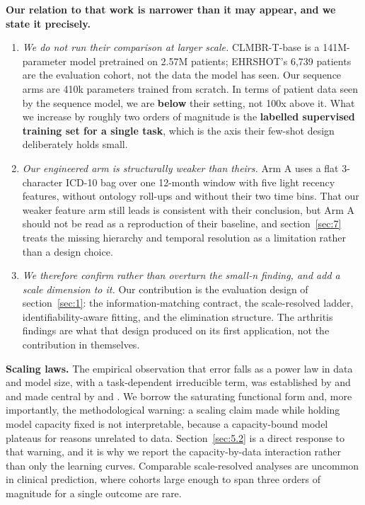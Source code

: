 \documentclass[10pt,twocolumn,letterpaper]{article}
\begin{document}
\textbf{Our relation to that work is narrower than it may appear, and we state it precisely.}



\begin{enumerate}
\item \emph{We do not run their comparison at larger scale.} CLMBR-T-base is a 141M-parameter model pretrained on 2.57M patients; EHRSHOT's 6,739 patients are the evaluation cohort, not the data the model has seen. Our sequence arms are 410k parameters trained from scratch. In terms of patient data seen by the sequence model, we are \textbf{below} their setting, not 100x above it. What we increase by roughly two orders of magnitude is the \textbf{labelled supervised training set for a single task}, which is the axis their few-shot design deliberately holds small.
\item \emph{Our engineered arm is structurally weaker than theirs.} Arm A uses a flat 3-character ICD-10 bag over one 12-month window with five light recency features, without ontology roll-ups and without their two time bins. That our weaker feature arm still leads is consistent with their conclusion, but Arm A should not be read as a reproduction of their baseline, and section~\ref{sec:7} treats the missing hierarchy and temporal resolution as a limitation rather than a design choice.
\item \emph{We therefore confirm rather than overturn the small-n finding, and add a scale dimension to it.} Our contribution is the evaluation design of section~\ref{sec:1}: the information-matching contract, the scale-resolved ladder, identifiability-aware fitting, and the elimination structure. The arthritis findings are what that design produced on its first application, not the contribution in themselves.
\end{enumerate}



\textbf{Scaling laws.} The empirical observation that error falls as a power law in data and model size, with a task-dependent irreducible term, was established by \citet{hestness2017scaling} and \citet{rosenfeld2020constructive} and made central by \citet{kaplan2020scaling} and \citet{hoffmann2022training}. We borrow the saturating functional form and, more importantly, the methodological warning: a scaling claim made while holding model capacity fixed is not interpretable, because a capacity-bound model plateaus for reasons unrelated to data. Section~\ref{sec:5.2} is a direct response to that warning, and it is why we report the capacity-by-data interaction rather than only the learning curves. Comparable scale-resolved analyses are uncommon in clinical prediction, where cohorts large enough to span three orders of magnitude for a single outcome are rare.
\end{document}
